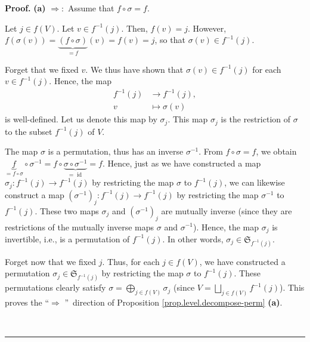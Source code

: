 \documentclass[numbers=enddot,12pt,final,onecolumn,notitlepage]{scrartcl}%
\numberwithin{exer}{section}
\theoremstyle{definition}
\newenvironment{proof}[1][Proof]{\noindent\textbf{#1.} }{\ \rule{0.5em}{0.5em}}
\let\sqcupnonlimits\bigsqcup
\let\oplusnonlimits\bigoplus
\renewcommand{\bigsqcup}{\sqcupnonlimits\limits}
\renewcommand{\bigoplus}{\oplusnonlimits\limits}
\newenvironment{verlong}{}{}
\begin{document}
\begin{verlong}


\begin{proof}
\textbf{(a)} $\Longrightarrow:$ Assume that $f\circ\sigma=f$.

Let $j\in f\left(  V\right)  $. Let $v\in f^{-1}\left(  j\right)  $. Then,
$f\left(  v\right)  =j$. However, $f\left(  \sigma\left(  v\right)  \right)
=\underbrace{\left(  f\circ\sigma\right)  }_{=f}\left(  v\right)  =f\left(
v\right)  =j$, so that $\sigma\left(  v\right)  \in f^{-1}\left(  j\right)  $.

Forget that we fixed $v$. We thus have shown that $\sigma\left(  v\right)  \in
f^{-1}\left(  j\right)  $ for each $v\in f^{-1}\left(  j\right)  $. Hence, the
map%
\begin{align*}
f^{-1}\left(  j\right)   &  \rightarrow f^{-1}\left(  j\right)  ,\\
v  &  \mapsto\sigma\left(  v\right)
\end{align*}
is well-defined. Let us denote this map by $\sigma_{j}$. This map $\sigma_{j}$
is the restriction of $\sigma$ to the subset $f^{-1}\left(  j\right)  $ of $V$.

The map $\sigma$ is a permutation, thus has an inverse $\sigma^{-1}$. From
$f\circ\sigma=f$, we obtain $\underbrace{f}_{=f\circ\sigma}\circ\sigma
^{-1}=f\circ\underbrace{\sigma\circ\sigma^{-1}}_{=\operatorname*{id}}=f$.
Hence, just as we have constructed a map $\sigma_{j}:f^{-1}\left(  j\right)
\rightarrow f^{-1}\left(  j\right)  $ by restricting the map $\sigma$ to
$f^{-1}\left(  j\right)  $, we can likewise construct a map $\left(
\sigma^{-1}\right)  _{j}:f^{-1}\left(  j\right)  \rightarrow f^{-1}\left(
j\right)  $ by restricting the map $\sigma^{-1}$ to $f^{-1}\left(  j\right)
$. These two maps $\sigma_{j}$ and $\left(  \sigma^{-1}\right)  _{j}$ are
mutually inverse (since they are restrictions of the mutually inverse maps
$\sigma$ and $\sigma^{-1}$). Hence, the map $\sigma_{j}$ is invertible, i.e.,
is a permutation of $f^{-1}\left(  j\right)  $. In other words, $\sigma_{j}%
\in\mathfrak{S}_{f^{-1}\left(  j\right)  }$.

Forget now that we fixed $j$. Thus, for each $j\in f\left(  V\right)  $, we
have constructed a permutation $\sigma_{j}\in\mathfrak{S}_{f^{-1}\left(
j\right)  }$ by restricting the map $\sigma$ to $f^{-1}\left(  j\right)  $.
These permutations clearly satisfy $\sigma=\bigoplus_{j\in f\left(  V\right)
}\sigma_{j}$ (since $V=\bigsqcup_{j\in f\left(  V\right)  }f^{-1}\left(
j\right)  $). This proves the \textquotedblleft$\Longrightarrow$%
\textquotedblright\ direction of Proposition \ref{prop.level.decompose-perm}
\textbf{(a)}.


\end{proof}
\end{verlong}
\end{document}
